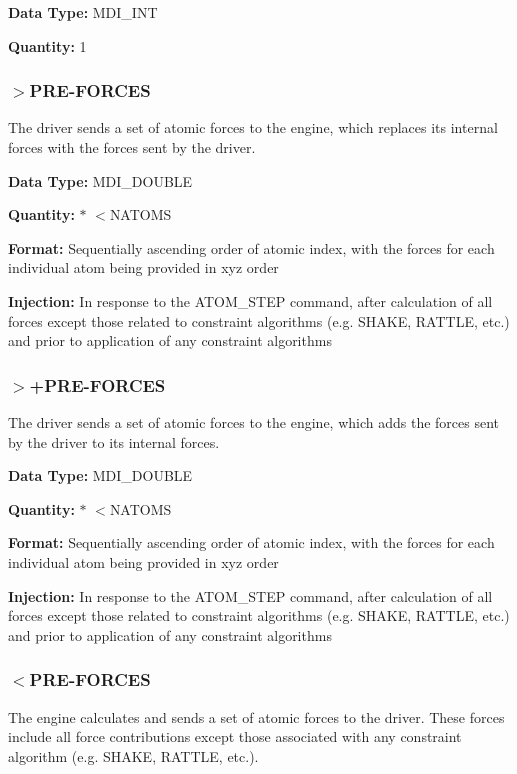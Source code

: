 \begin{DoxyParagraph}{}
{\bfseries  Data Type\-: } M\-D\-I\-\_\-\-I\-N\-T \par
 {\bfseries  Quantity\-: } 1
\end{DoxyParagraph}
\hypertarget{index_send_preforces}{}\subsubsection{$>$\-P\-R\-E-\/\-F\-O\-R\-C\-E\-S}\label{index_send_preforces}
The driver sends a set of atomic forces to the engine, which replaces its internal forces with the forces sent by the driver.

\begin{DoxyParagraph}{}
{\bfseries  Data Type\-: } M\-D\-I\-\_\-\-D\-O\-U\-B\-L\-E \par
 {\bfseries  Quantity\-: } { $\ast$ $<$N\-A\-T\-O\-M\-S } \par
 {\bfseries  Format\-: } Sequentially ascending order of atomic index, with the forces for each individual atom being provided in xyz order \par
 {\bfseries  Injection\-: } In response to the {\ttfamily A\-T\-O\-M\-\_\-\-S\-T\-E\-P} command, after calculation of all forces except those related to constraint algorithms (e.\-g. S\-H\-A\-K\-E, R\-A\-T\-T\-L\-E, etc.) and prior to application of any constraint algorithms
\end{DoxyParagraph}
\hypertarget{index_send_add_preforces}{}\subsubsection{$>$+\-P\-R\-E-\/\-F\-O\-R\-C\-E\-S}\label{index_send_add_preforces}
The driver sends a set of atomic forces to the engine, which adds the forces sent by the driver to its internal forces.

\begin{DoxyParagraph}{}
{\bfseries  Data Type\-: } M\-D\-I\-\_\-\-D\-O\-U\-B\-L\-E \par
 {\bfseries  Quantity\-: } { $\ast$ $<$N\-A\-T\-O\-M\-S } \par
 {\bfseries  Format\-: } Sequentially ascending order of atomic index, with the forces for each individual atom being provided in xyz order \par
 {\bfseries  Injection\-: } In response to the {\ttfamily A\-T\-O\-M\-\_\-\-S\-T\-E\-P} command, after calculation of all forces except those related to constraint algorithms (e.\-g. S\-H\-A\-K\-E, R\-A\-T\-T\-L\-E, etc.) and prior to application of any constraint algorithms
\end{DoxyParagraph}
\hypertarget{index_recv_preforces}{}\subsubsection{$<$\-P\-R\-E-\/\-F\-O\-R\-C\-E\-S}\label{index_recv_preforces}
The engine calculates and sends a set of atomic forces to the driver. These forces include all force contributions except those associated with any constraint algorithm (e.\-g. S\-H\-A\-K\-E, R\-A\-T\-T\-L\-E, etc.).

